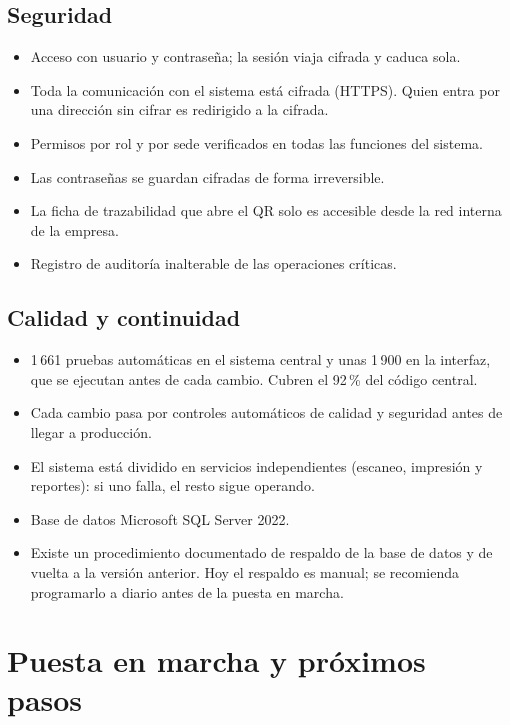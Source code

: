 \documentclass[11pt,a4paper]{article}
\begin{document}
\subsection{Seguridad}

\begin{itemize}
  \item Acceso con usuario y contraseña; la sesión viaja cifrada y caduca sola.
  \item Toda la comunicación con el sistema está cifrada (HTTPS). Quien entra por una dirección sin cifrar es redirigido a la cifrada.
  \item Permisos por rol y por sede verificados en todas las funciones del sistema.
  \item Las contraseñas se guardan cifradas de forma irreversible.
  \item La ficha de trazabilidad que abre el QR solo es accesible desde la red interna de la empresa.
  \item Registro de auditoría inalterable de las operaciones críticas.
\end{itemize}

\subsection{Calidad y continuidad}

\begin{itemize}
  \item 1\,661 pruebas automáticas en el sistema central y unas 1\,900 en la interfaz, que se ejecutan antes de cada cambio. Cubren el 92\,\% del código central.
  \item Cada cambio pasa por controles automáticos de calidad y seguridad antes de llegar a producción.
  \item El sistema está dividido en servicios independientes (escaneo, impresión y reportes): si uno falla, el resto sigue operando.
  \item Base de datos Microsoft SQL Server 2022.
  \item Existe un procedimiento documentado de respaldo de la base de datos y de vuelta a la versión anterior. Hoy el respaldo es manual; se recomienda programarlo a diario antes de la puesta en marcha.
\end{itemize}

\section{Puesta en marcha y próximos pasos}
\end{document}
